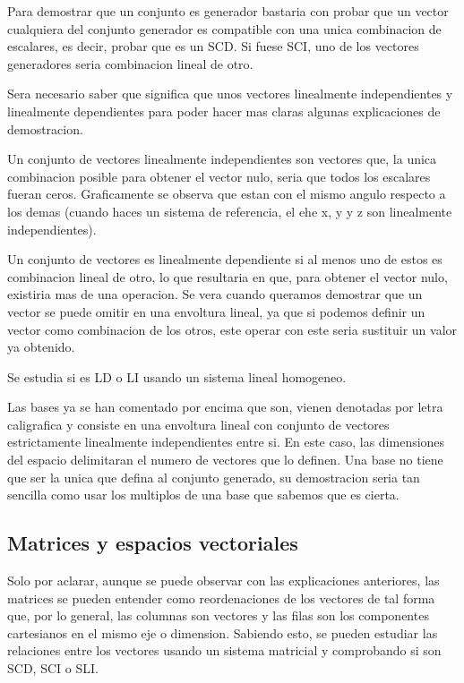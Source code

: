 \documentclass[11pt,a4paper]{article}
\begin{document}
Para demostrar que un conjunto es generador bastaria con probar que un vector cualquiera del conjunto generador es compatible con una unica combinacion de escalares, es decir, probar que es un SCD. Si fuese SCI, uno de los vectores generadores seria combinacion lineal de otro.
 
  Sera necesario saber que significa que unos vectores linealmente independientes y linealmente dependientes para poder hacer mas claras algunas explicaciones de demostracion.
  
  Un conjunto de vectores linealmente independientes son vectores que, la unica combinacion posible para obtener el vector nulo, seria que todos los escalares fueran ceros. Graficamente se observa que estan con el mismo angulo respecto a los demas (cuando haces un sistema de referencia, el ehe x, y y z son linealmente independientes).
  
  Un conjunto de vectores es linealmente dependiente si al menos uno de estos es combinacion lineal de otro, lo que resultaria en que, para obtener el vector nulo, existiria mas de una operacion. Se vera cuando queramos demostrar que un vector se puede omitir en una envoltura lineal, ya que si podemos definir un vector como combinacion de los otros, este operar con este seria sustituir un valor ya obtenido.
  
  Se estudia si es LD o LI usando un sistema lineal homogeneo.
  
  Las bases ya se han comentado por encima que son, vienen denotadas por letra caligrafica
y consiste en una envoltura lineal con conjunto de vectores estrictamente linealmente independientes entre si. En este caso, las dimensiones del espacio delimitaran el numero de vectores que lo definen. Una base no tiene que ser la unica que defina al conjunto generado, su demostracion seria tan sencilla como usar los multiplos de una base que sabemos que es cierta.

\subsection{Matrices y espacios vectoriales}

Solo por aclarar, aunque se puede observar con las explicaciones anteriores, las matrices se pueden entender como reordenaciones de los vectores de tal forma que, por lo general, las columnas son vectores y las filas son los componentes cartesianos en el mismo eje o dimension. Sabiendo esto, se pueden estudiar las relaciones entre los vectores usando un sistema matricial y comprobando si son SCD, SCI o SLI. 
\end{document}
